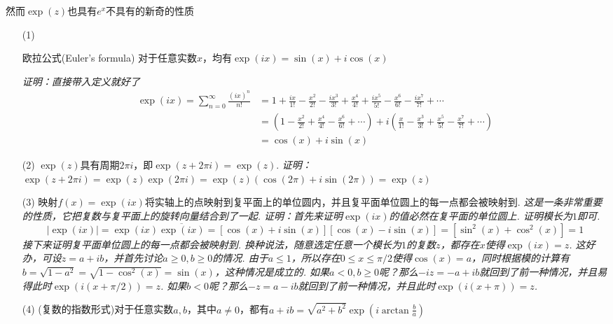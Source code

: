 \documentclass[main.tex]{subfiles}
\begin{document}
然而\(\exp(z)\)也具有\(e^x\)不具有的新奇的性质
\begin{itemize}
    \item [(1)] \begin{theorem}{欧拉公式(Euler's formula)}
        对于任意实数\(x\)，均有\(\exp(ix) = \sin(x)+i\cos(x)\)
    \end{theorem}
    \textit{
        证明：直接带入定义就好了
    }
    \begin{align*}
        \exp(ix) = \sum_{n=0}^{\infty} \frac{(ix)^n}{n!} &= 1+\frac{ix}{1!}-\frac{x^2}{2!}-\frac{ix^3}{3!}+\frac{x^4}{4!}+\frac{ix^5}{5!}-\frac{x^6}{6!}-\frac{ix^7}{7!}+\cdots \\
        &= \left(1-\frac{x^2}{2!}+\frac{x^4}{4!}-\frac{x^6}{6!}+\cdots\right)+i\left(\frac{x}{1!}-\frac{x^3}{3!}+\frac{x^5}{5!}-\frac{x^7}{7!}+\cdots\right) \\
        &= \cos(x)+i\sin(x)
    \end{align*}
    \item [(2)] \(\exp(z)\)具有周期\(2\pi i\)，即\(\exp(z+2\pi i) = \exp(z)\).
    \newline
    \textit{
        证明：\(\exp(z+2\pi i) = \exp(z)\exp(2\pi i) = \exp(z)(\cos(2\pi)+i\sin(2\pi)) = \exp(z)\)
    }
    \item [(3)] 映射\(f(x) = \exp(ix)\)将实轴上的点映射到复平面上的单位圆内，并且复平面单位圆上的每一点都会被映射到.
    \newline
    \textit{
        这是一条非常重要的性质，它把复数与复平面上的旋转向量结合到了一起.
        \newline
        证明：首先来证明\(\exp(ix)\)的值必然在复平面的单位圆上. 证明模长为\(1\)即可.
        \[|\exp(ix)| = \exp(ix)\overline{\exp(ix)} = [\cos(x)+i\sin(x)][\cos(x)-i\sin(x)] = \left[\sin^2(x)+\cos^2(x)\right] = 1\]
        接下来证明复平面单位圆上的每一点都会被映射到. 换种说法，随意选定任意一个模长为\(1\)的复数\(z\)，都存在\(x\)使得\(\exp(ix)=z\). 这好办，可设\(z=a+ib\)，并首先讨论\(a \geq 0, b \geq 0\)的情况. 由于\(a\leq 1\)，所以存在\(0\leq x \leq \pi/2\)使得\(\cos(x)=a\)，同时根据模的计算有\(b=\sqrt{1-a^2}=\sqrt{1-\cos^2(x)}=\sin(x)\)，这种情况是成立的. 如果\(a<0, b \geq 0\)呢？那么\(-iz=-a+ib\)就回到了前一种情况，并且易得此时\(\exp(i(x+\pi/2))=z\). 如果\(b<0\)呢？那么\(-z=a-ib\)就回到了前一种情况，并且此时\(\exp(i(x+\pi))=z\).
    }
    \item [(4)] (复数的指数形式)对于任意实数\(a,b\)，其中\(a\neq 0\)，都有\(\displaystyle{a+ib = \sqrt{a^2+b^2}\exp\left(i\arctan\frac{b}{a}\right)}\)
    \newline

\end{itemize}
\end{document}
